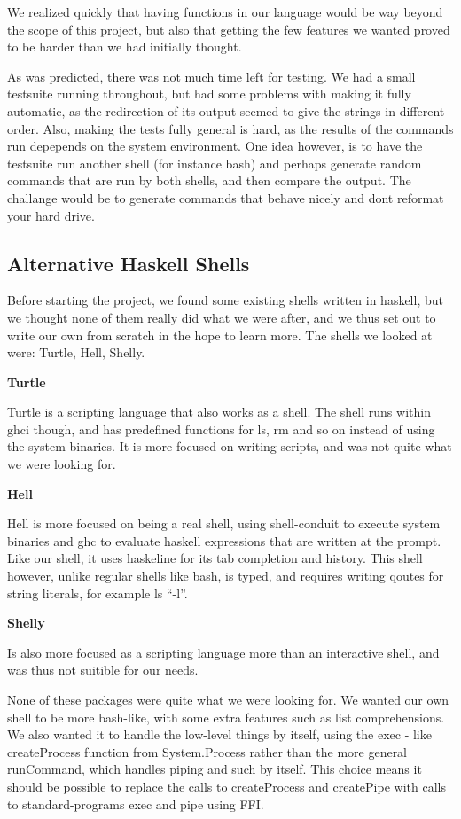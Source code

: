 \documentclass[11pt,a4paper]{article}
\begin{document}
We realized quickly that having functions in our language would be way beyond
the scope of this project, but also that getting the few features we wanted
proved to be harder than we had initially thought.

As was predicted, there was not much time left for testing. We had a small
testsuite running throughout, but had some problems with making it fully
automatic, as the redirection of its output seemed to give the strings in
different order. Also, making the tests fully general is hard, as the results
of the commands run depepends on the system environment. One idea however, is
to have the testsuite run another shell (for instance bash) and perhaps
generate random commands that are run by both shells, and then compare the
output. The challange would be to generate commands that behave nicely and dont
reformat your hard drive.

\subsection{Alternative Haskell Shells}

Before starting the project, we found some existing shells written in haskell, but we thought none of them really did what we were after, and we thus set out to write our own from scratch in the hope to learn more. The shells we looked at were: Turtle, Hell, Shelly.

\textbf{Turtle}

Turtle is a scripting language that also works as a shell. The shell runs
within ghci though, and has predefined functions for ls, rm and so on instead
of using the system binaries. It is more focused on writing scripts, and was
not quite what we were looking for.

\textbf{Hell}

Hell is more focused on being a real shell, using shell-conduit to execute
system binaries and ghc to evaluate haskell expressions that are written at the
prompt. Like our shell, it uses haskeline for its tab completion and history.
This shell however, unlike regular shells like bash, is typed, and requires
writing qoutes for string literals, for example ls ``-l''.

\textbf{Shelly}

Is also more focused as a scripting language more than an interactive shell,
and was thus not suitible for our needs.

None of these packages were quite what we were looking for. We wanted
our own shell to be more bash-like, with some extra features such as list
comprehensions. We also wanted it to handle the low-level things by itself,
using the exec - like createProcess function from System.Process rather than
the more general runCommand, which handles piping and such by itself. This
choice means it should be possible to replace the calls to createProcess and
createPipe with calls to standard-programs exec and pipe using FFI.
\end{document}
